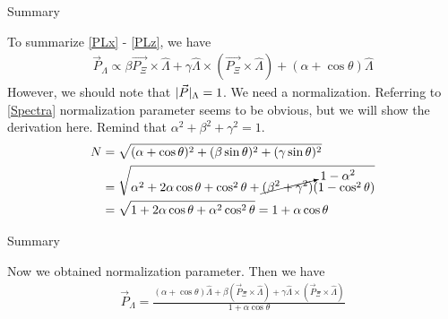 \documentclass[
	xcolor=dvipsnames,
	10pt, 
	]{beamer}
\begin{document}
\begin{frame}{Summary}
	\begin{block}{}
		To summarize \eqref{PLx} - \eqref{PLz}, we have
		\begin{align*}
			\vec{P}_\Lambda \propto \beta \vec{P_\Xi}\times\hat \Lambda + \gamma\hat \Lambda\times( \vec{P_\Xi}\times\hat \Lambda)+(\alpha+\cos\theta)\hat\Lambda
		\end{align*}
		However, we should note that $|\vec P|_\Lambda=1$. We need a normalization. Referring to  \eqref{Spectra} normalization parameter seems to be obvious, but we will show the derivation here. Remind that $\alpha^2+\beta^2+\gamma^2=1$.
		\begin{align}
			N&=\sqrt{(\alpha+\cos\theta)^2+(\beta\sin\theta)^2+(\gamma\sin\theta)^2}\nonumber\\
			&=\sqrt{\alpha^2+2\alpha\cos\theta +\cos^2\theta + \cancelto{1-\alpha^2}{(\beta^2+\gamma^2)}(1-\cos^2\theta)}\nonumber\\
			&= \sqrt{1 +2\alpha\cos\theta+\alpha^2\cos^2\theta}=1+\alpha\cos\theta
		\end{align}
	\end{block}
\end{frame}
\begin{frame}{Summary}
	\begin{block}{}
		Now we obtained normalization parameter. Then we have
		\begin{align}
			\vec{P}_\Lambda=\frac{(\alpha+\cos\theta)\hat\Lambda+\beta(\vec P_\Xi\times\hat\Lambda)+\gamma\hat\Lambda\times(\vec P_\Xi\times\hat\Lambda)}{1+\alpha\cos\theta}
		\end{align}
	\end{block}
\end{frame}
\end{document}
